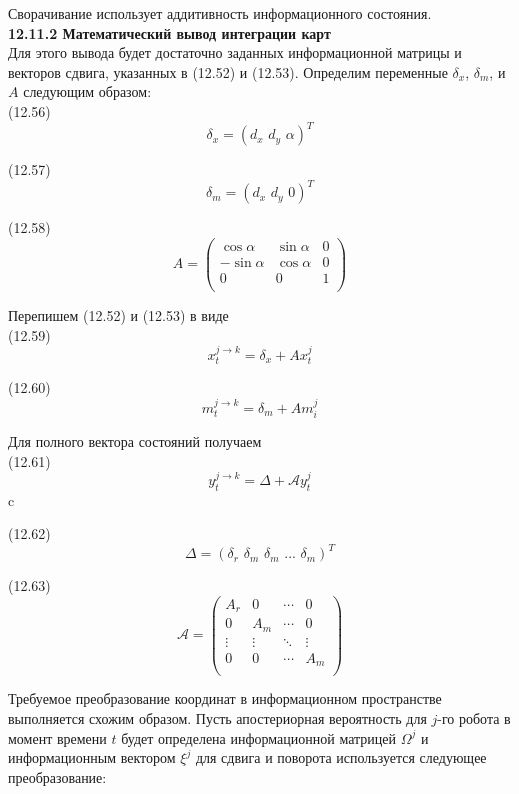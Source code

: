 \documentclass[10pt,a4paper]{article}
\begin{document}
Сворачивание использует аддитивность информационного состояния.\\

\textbf{12.11.2	Математический вывод интеграции карт}\\

Для этого вывода будет достаточно заданных информационной матрицы и векторов сдвига, указанных в (12.52) и (12.53). Определим переменные $\delta_x$, $\delta_m$, и $A$ следующим образом:\\

(12.56)
$$\delta_x=(d_x\,\,d_y\,\,\alpha)^T$$

(12.57)
$$\delta_m=(d_x\,\,d_y\,\,0)^T$$

(12.58)
$$A=\left(\begin{array}{ccc}\cos\alpha&\sin\alpha&0\\-\sin\alpha&\cos\alpha&0\\0&0&1\\\end{array}\right)$$

Перепишем (12.52) и (12.53) в виде\\

(12.59)
$$x_t^{j\longrightarrow k}=\delta_x+Ax_t^j$$

(12.60)
$$m_t^{j\longrightarrow k}=\delta_m+Am_i^j$$

Для полного вектора состояний получаем\\

(12.61)
$$y_t^{j\longrightarrow k}=\varDelta+\mathcal{A}y_t^j$$
c

(12.62)
$$\varDelta=(\delta_r\,\,\delta_m\,\,\delta_m\,\,...\,\,\delta_m)^T$$
 
(12.63)
$$\mathcal{A}=\left(\begin{array}{cccc}A_r&0&\cdots&0\\
0&A_m&\cdots&0\\
\vdots&\vdots&\ddots&\vdots\\
0&0&\cdots&A_m\\
\end{array}\right)$$

Требуемое преобразование координат в информационном пространстве выполняется схожим образом. Пусть апостериорная вероятность для $j$-го робота в момент времени $t$ будет определена информационной матрицей $\varOmega^j$ и информационным вектором $\xi^j$ для сдвига и поворота используется следующее преобразование:\\
\end{document}
